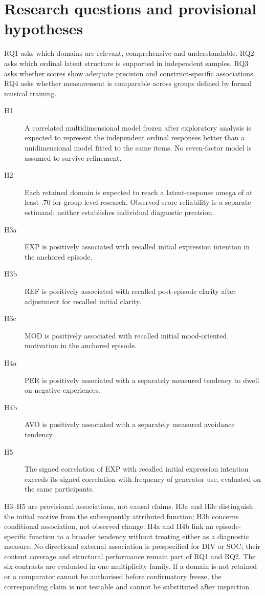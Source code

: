 \section{Research questions and provisional hypotheses}
RQ1 asks which domains are relevant, comprehensive and understandable. RQ2 asks which ordinal latent structure is supported in independent samples. RQ3 asks whether scores show adequate precision and construct-specific associations. RQ4 asks whether measurement is comparable across groups defined by formal musical training.
\begin{description}
\item[H1] A correlated multidimensional model frozen after exploratory analysis is expected to represent the independent ordinal responses better than a unidimensional model fitted to the same items. No seven-factor model is assumed to survive refinement.
\item[H2] Each retained domain is expected to reach a latent-response omega of at least .70 for group-level research. Observed-score reliability is a separate estimand; neither establishes individual diagnostic precision.
\item[H3a] EXP is positively associated with recalled initial expression intention in the anchored episode.
\item[H3b] REF is positively associated with recalled post-episode clarity after adjustment for recalled initial clarity.
\item[H3c] MOD is positively associated with recalled initial mood-oriented motivation in the anchored episode.
\item[H4a] PER is positively associated with a separately measured tendency to dwell on negative experiences.
\item[H4b] AVO is positively associated with a separately measured avoidance tendency.
\item[H5] The signed correlation of EXP with recalled initial expression intention exceeds its signed correlation with frequency of generator use, evaluated on the same participants.
\end{description}
H3--H5 are provisional associations, not causal claims. H3a and H3c distinguish the initial motive from the subsequently attributed function; H3b concerns conditional association, not observed change. H4a and H4b link an episode-specific function to a broader tendency without treating either as a diagnostic measure. No directional external association is prespecified for DIV or SOC; their content coverage and structural performance remain part of RQ1 and RQ2. The six contrasts are evaluated in one multiplicity family. If a domain is not retained or a comparator cannot be authorised before confirmatory freeze, the corresponding claim is not testable and cannot be substituted after inspection.

